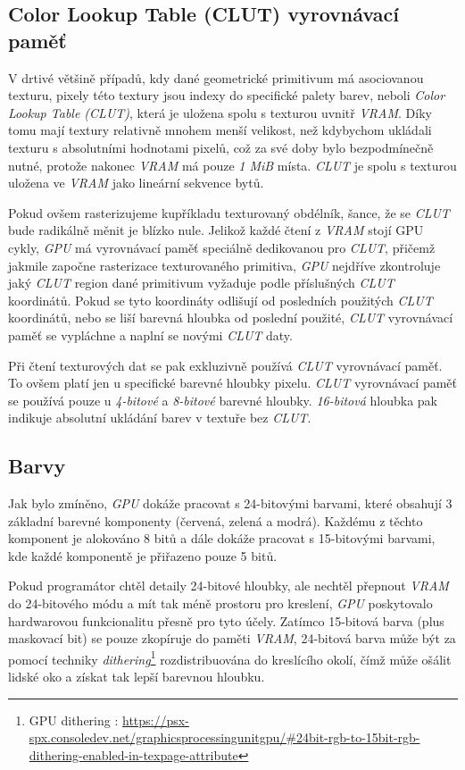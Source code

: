 \subsection{Color Lookup Table (CLUT) vyrovnávací paměť} \label{clut}

V drtivé většině případů, kdy dané geometrické primitivum má asociovanou texturu, pixely této textury jsou indexy do specifické palety barev, neboli \textit{Color Lookup Table (CLUT)}, která je uložena spolu s texturou uvnitř \textit{VRAM}.
Díky tomu mají textury relativně mnohem menší velikost, než kdybychom ukládali texturu s absolutními hodnotami pixelů, což za své doby
bylo bezpodmínečně nutné, protože nakonec \textit{VRAM} má pouze \textit{1 MiB} místa. \textit{CLUT} je spolu s texturou uložena ve \textit{VRAM} jako
lineární sekvence bytů.

Pokud ovšem rasterizujeme kupříkladu texturovaný obdélník, šance, že se \textit{CLUT} bude radikálně měnit je blízko nule. Jelikož každé
čtení z \textit{VRAM} stojí GPU cykly, \textit{GPU} má vyrovnávací paměť speciálně dedikovanou pro \textit{CLUT}, přičemž
jakmile započne rasterizace texturovaného primitiva, \textit{GPU} nejdříve zkontroluje jaký \textit{CLUT} region dané primitivum vyžaduje podle
příslušných \textit{CLUT} koordinátů. Pokud se tyto koordináty odlišují od posledních použitých \textit{CLUT} koordinátů, nebo se liší barevná
hloubka od poslední použité, \textit{CLUT} vyrovnávací paměť se vypláchne a naplní se novými \textit{CLUT} daty.

Při čtení texturových dat se pak exkluzivně používá \textit{CLUT} vyrovnávací paměť. To ovšem platí jen u specifické barevné
hloubky pixelu. \textit{CLUT} vyrovnávací paměť se používá pouze u \textit{4-bitové} a \textit{8-bitové} barevné hloubky. \textit{16-bitová} hloubka
pak indikuje absolutní ukládání barev v textuře bez \textit{CLUT}.

\subsection{Barvy}

Jak bylo zmíněno, \textit{GPU} dokáže pracovat s 24-bitovými barvami, které obsahují 3 základní barevné komponenty (červená, zelená a modrá). 
Každému z těchto komponent je alokováno 8 bitů a dále dokáže pracovat s 15-bitovými barvami, kde každé komponentě je přiřazeno pouze 5 bitů.

Pokud programátor chtěl detaily 24-bitové hloubky, ale nechtěl přepnout \textit{VRAM} do 24-bitového módu a mít tak méně prostoru pro kreslení, \textit{GPU} poskytovalo hardwarovou funkcionalitu přesně pro tyto účely. 
Zatímco 15-bitová barva (plus maskovací bit) se pouze zkopíruje do paměti \textit{VRAM}, 24-bitová barva může být za pomocí techniky \textit{dithering}\footnote{GPU dithering \cite{PSXSpec}: \url{https://psx-spx.consoledev.net/graphicsprocessingunitgpu/\#24bit-rgb-to-15bit-rgb-dithering-enabled-in-texpage-attribute}} rozdistribuována do kreslícího okolí, čímž může ošálit lidské oko a získat tak lepší barevnou hloubku. 

